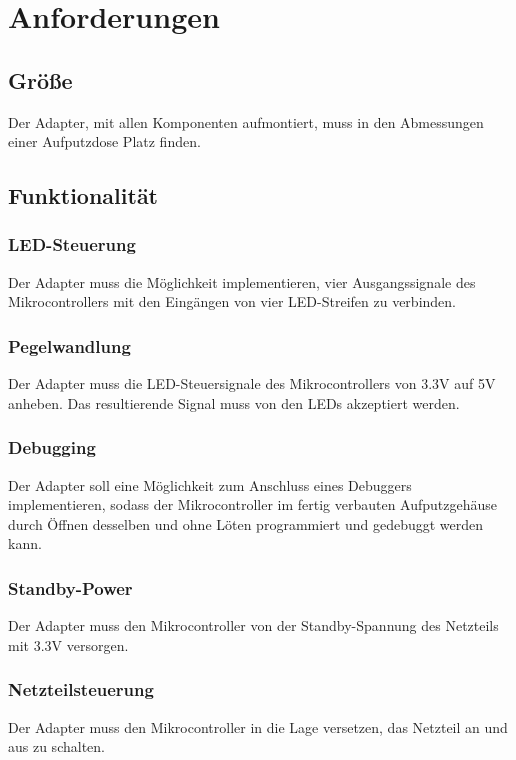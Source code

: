
\section{Anforderungen}

\subsection{Gr\"o{\ss}e}
Der Adapter, mit allen Komponenten aufmontiert,
muss in den Abmessungen einer Aufputzdose Platz finden.

\subsection{Funktionalit\"at}
\subsubsection{LED-Steuerung}
Der Adapter muss die M\"oglichkeit implementieren,
vier Ausgangssignale des Mikrocontrollers
mit den Eing\"angen von vier LED-Streifen zu verbinden.

\subsubsection{Pegelwandlung}
Der Adapter muss die LED-Steuersignale des Mikrocontrollers
von 3.3V auf 5V anheben.
Das resultierende Signal muss von den LEDs akzeptiert werden.

\subsubsection{Debugging}
Der Adapter soll eine M\"oglichkeit zum Anschluss
eines Debuggers implementieren,
sodass der Mikrocontroller
im fertig verbauten Aufputzgeh\"ause
durch \"Offnen desselben und ohne L\"oten
programmiert und gedebuggt werden kann.

\subsubsection{Standby-Power}
Der Adapter muss den Mikrocontroller
von der Standby-Spannung
des Netzteils mit 3.3V versorgen.

\subsubsection{Netzteilsteuerung}
Der Adapter muss den Mikrocontroller in die Lage versetzen,
das Netzteil an und aus zu schalten.

